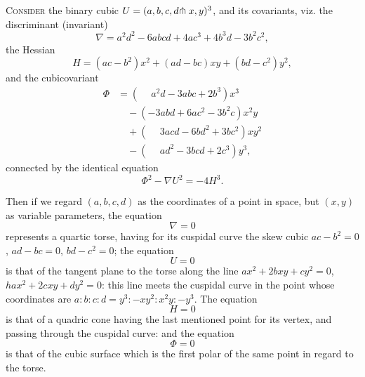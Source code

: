 \documentclass[11pt,a4paper]{article}
\begin{document}
\textsc{Consider} the binary cubic $U=(a,b,c,d\hspace{-0.2em}\pitchfork x,y)^{3}$, and its covariants, viz. the discriminant (invariant)
\[
\nabla = a^{2}d^{2} - 6abcd + 4ac^{3} + 4b^{3}d - 3b^{2}c^{2},
\]
the Hessian
\[
H = (ac-b^{2})x^{2} + (ad-bc)xy + (bd-c^{2})y^{2},
\]
and the cubicovariant
\begin{align*}
\Phi &= (\phantom{-}a^{2}d - 3abc + 2b^{3})x^{3}\\
&\quad - (-3abd + 6ac^{2} - 3b^{2}c)x^{2}y\\
&\quad + (\phantom{-}3acd - 6bd^{2} + 3bc^{2})xy^{2}\\
&\quad - (\phantom{-}ad^{2} - 3bcd + 2c^{3})y^{3},
\end{align*}
connected by the identical equation
\[
\Phi^{2} - \nabla U^{2} = -4H^{3}.
\]

Then if we regard $(a, b, c, d)$ as the coordinates of a point in space, but $(x, y)$ as variable parameters, the equation
\[
\nabla = 0
\]
represents a quartic torse, having for its cuspidal curve the skew cubic $ac-b^{2}=0$, $ad-bc=0$, $bd-c^{2}=0$; the equation
\[
U = 0
\]
is that of the tangent plane to the torse along the line $ax^{2}+2bxy+cy^{2}=0$, $hax^{2}+2cxy+dy^{2}=0$: this line meets the cuspidal curve in the point whose coordinates are $a:b:c:d = y^{3}:-xy^{2}:x^{2}y:-y^{3}$. The equation
\[
H = 0
\]
is that of a quadric cone having the last mentioned point for its vertex, and passing through the cuspidal curve: and the equation
\[
\Phi = 0
\]
is that of the cubic surface which is the first polar of the same point in regard to the torse.
\end{document}
